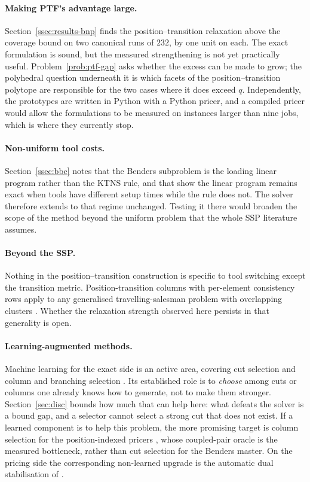 \paragraph{Making PTF's advantage large.}
Section~\ref{ssec:results-bnp} finds the position--transition relaxation above the
coverage bound on two canonical runs of $232$, by one unit on each. The exact
formulation is sound, but the measured strengthening is not yet practically useful.
Problem~\ref{prob:ptf-gap} asks whether
the excess can be made to grow; the polyhedral question underneath it is which facets
of the position--transition polytope are responsible for the two cases where it does
exceed $q$. Independently, the prototypes are written in Python with a Python pricer,
and a compiled pricer would allow the formulations to be measured on instances larger
than nine jobs, which is where they currently stop.

\paragraph{Non-uniform tool costs.}
Section~\ref{ssec:bbc} notes that the Benders subproblem is the loading linear program
rather than the KTNS rule, and that \citet{Crama1994} show the linear program remains
exact when tools have different setup times while the rule does not. The solver
therefore extends to that regime unchanged. Testing it there would broaden the scope of
the method beyond the uniform problem that the whole SSP literature assumes.

\paragraph{Beyond the SSP.}
Nothing in the position--transition construction is specific to tool switching except
the transition metric. Position-transition columns with per-element consistency rows
apply to any generalised travelling-salesman problem with overlapping clusters
\citep{Pop2024}. Whether the relaxation strength observed here persists in that
generality is open.

\paragraph{Learning-augmented methods.}
Machine learning for the exact side is an active area, covering cut selection
\citep{Tang2020,DezaKhalil2023} and column and branching selection
\citep{Bengio2021,Gasse2019,Morabit2021}. Its established role is to \emph{choose}
among cuts or columns one already knows how to generate, not to make them stronger.
Section~\ref{sec:disc} bounds how much that can help here: what defeats the solver is
a bound gap, and a selector cannot select a strong cut that does not exist. If a
learned component is to help this problem, the more promising target is column
selection for the position-indexed pricers \citep{Morabit2021}, whose coupled-pair
oracle is the measured bottleneck, rather than cut selection for the Benders master.
On the pricing side the corresponding non-learned upgrade is the automatic dual
stabilisation of \citet{Pessoa2018}.
